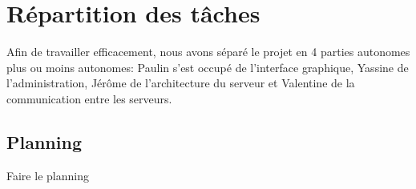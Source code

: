 \section{Répartition des tâches}

\par Afin de travailler efficacement, nous avons séparé le projet en 4 parties autonomes plus ou moins autonomes: Paulin s'est occupé de l'interface graphique, Yassine de l'administration, Jérôme de l'architecture du serveur et Valentine de la communication entre les serveurs.

\subsection{Planning}

Faire le planning